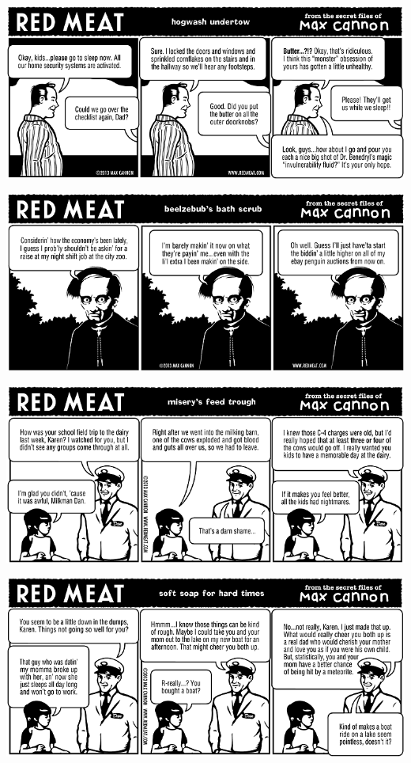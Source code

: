 \documentclass[a4paper,twoside,11pt]{article}
\begin{document}
\includegraphics[width=\textwidth]{redmeat_2013-04-30.png}



\includegraphics[width=\textwidth]{redmeat_2013-05-07.png}



\includegraphics[width=\textwidth]{redmeat_2013-05-14.png}



\includegraphics[width=\textwidth]{redmeat_2013-05-21.png}
\end{document}
